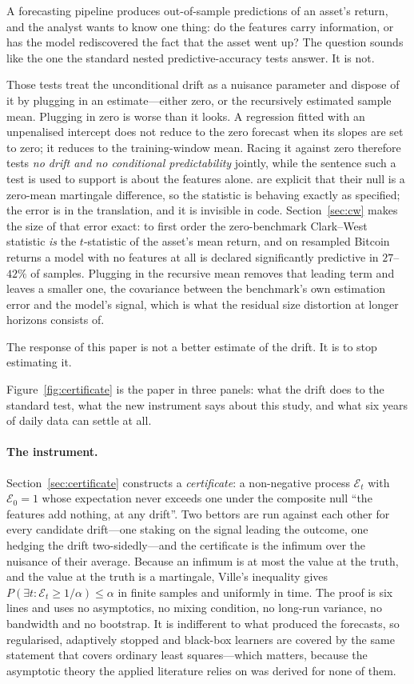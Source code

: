 \documentclass{article}
\theoremstyle{plain}
\theoremstyle{definition}
\begin{document}
A forecasting pipeline produces out-of-sample predictions of an asset's return, and the
analyst wants to know one thing: do the features carry information, or has the model
rediscovered the fact that the asset went up? The question sounds like the one the standard
nested predictive-accuracy tests answer. It is not.

Those tests treat the unconditional drift as a nuisance parameter and dispose of it by
plugging in an estimate---either zero, or the recursively estimated sample mean. Plugging in
zero is worse than it looks. A regression fitted with an unpenalised intercept does not
reduce to the zero forecast when its slopes are set to zero; it reduces to the
training-window mean. Racing it against zero therefore tests \emph{no drift and no
conditional predictability} jointly, while the sentence such a test is used to support is
about the features alone. \citet{clark2006} are explicit that their null is a zero-mean
martingale difference, so the statistic is behaving exactly as specified; the error is in
the translation, and it is invisible in code. Section~\ref{sec:cw} makes the size of that
error exact: to first order the zero-benchmark Clark--West statistic \emph{is} the
$t$-statistic of the asset's mean return, and on resampled Bitcoin returns a model with
no features at all is declared significantly predictive in $27$--$42\%$ of samples.
Plugging in the recursive mean removes that leading term and leaves a smaller one, the
covariance between the benchmark's own estimation error and the model's signal, which is
what the residual size distortion at longer horizons consists of.

The response of this paper is not a better estimate of the drift. It is to stop estimating
it.

Figure~\ref{fig:certificate} is the paper in three panels: what the drift does to the
standard test, what the new instrument says about this study, and what six years of daily
data can settle at all.

\paragraph{The instrument.} Section~\ref{sec:certificate} constructs a \emph{certificate}: a
non-negative process $\mathcal{E}_t$ with $\mathcal{E}_0=1$ whose expectation never exceeds
one under the composite null ``the features add nothing, at any drift''. Two bettors are run
against each other for every candidate drift---one staking on the signal leading the
outcome, one hedging the drift two-sidedly---and the certificate is the infimum over the
nuisance of their average. Because an infimum is at most the value at the truth, and the
value at the truth is a martingale, Ville's inequality gives
$P(\exists t:\mathcal{E}_t\ge1/\alpha)\le\alpha$ in finite samples and uniformly in time.
The proof is six lines and uses no asymptotics, no mixing condition, no long-run variance,
no bandwidth and no bootstrap. It is indifferent to what produced the forecasts, so
regularised, adaptively stopped and black-box learners are covered by the same statement
that covers ordinary least squares---which matters, because the asymptotic theory the
applied literature relies on was derived for none of them.
\end{document}
